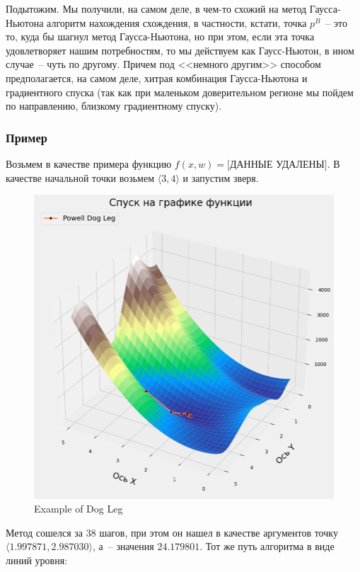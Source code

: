 \documentclass[12pt, a4paper, oneside, final]{article}
\begin{document}
	Подытожим.
	Мы получили, на самом деле, в чем-то схожий на метод Гаусса-Ньютона алгоритм нахождения схождения, в частности, кстати, точка $p^B$~-- это то, куда бы шагнул метод Гаусса-Ньютона, но при этом, если эта точка удовлетворяет нашим потребностям, то мы действуем как Гаусс-Ньютон, в ином случае~-- чуть по другому.
	Причем под <<немного другим>> способом предполагается, на самом деле, хитрая комбинация Гаусса-Ньютона и градиентного спуска (так как при маленьком доверительном регионе мы пойдем по направлению, близкому градиентному спуску).
	\subsubsection*{Пример}
	Возьмем в качестве примера функцию $f(x, w) = \texttt{[ДАННЫЕ УДАЛЕНЫ]}$.
	В качестве начальной точки возьмем $\langle 3, 4 \rangle$ и запустим зверя.
	\begin{figure}[H]
		\centering
		\includegraphics[scale = 0.55]{Image/T1_DOGLEG_3D_PLOT_1.png}
		\caption*{Example of Dog Leg}
	\end{figure}
	Метод сошелся за $38$ шагов, при этом он нашел в качестве аргументов точку $\langle 1.997871, 2.987030 \rangle$, а~-- значения $24.179801$.
	Тот же путь алгоритма в виде линий уровня:
\end{document}
